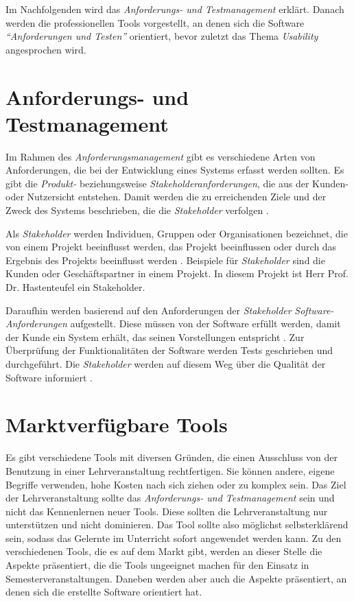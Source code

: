 \documentclass[11pt,a4paper]{report}
\begin{document}
Im Nachfolgenden wird das \textit{Anforderungs- und Testmanagement} erklärt. Danach werden die professionellen Tools vorgestellt, an denen sich die Software  \textit{"`Anforderungen und Testen"'} orientiert, bevor zuletzt das Thema \textit{Usability} angesprochen wird.

\section{Anforderungs- und Testmanagement} 
\label{s:anfundtest}

Im Rahmen des \textit{Anforderungsmanagement} gibt es verschiedene Arten von Anforderungen, die bei der Entwicklung eines Systems erfasst werden sollten. Es gibt die \textit{Produkt-} beziehungsweise \textit{Stakeholderanforderungen}, die aus der Kunden- oder Nutzersicht entstehen. Damit werden die zu erreichenden Ziele und der Zweck des Systems beschrieben, die die \textit{Stakeholder} verfolgen \cite{htm}. 

Als \textit{Stakeholder} werden Individuen, Gruppen oder Organisationen bezeichnet, die von einem Projekt beeinflusst werden, das Projekt beeinflussen oder durch das Ergebnis des Projekts beeinflusst werden \cite{pmbok}. Beispiele für \textit{Stakeholder} sind die Kunden oder Geschäftspartner in einem Projekt. In diesem Projekt ist Herr Prof. Dr. Hastenteufel ein Stakeholder.


Daraufhin werden basierend auf den Anforderungen der \textit{Stakeholder} \textit{Software-Anforderungen} aufgestellt. Diese müssen von der Software erfüllt werden, damit der Kunde ein System erhält, das seinen Vorstellungen entspricht \cite{htm}. Zur Überprüfung der Funktionalitäten der Software werden Tests geschrieben und durchgeführt. Die \textit{Stakeholder} werden auf diesem Weg über die Qualität der Software informiert \cite{powerpoint}.


\section{Marktverfügbare Tools} 
\label{chap:Tools}


Es gibt verschiedene Tools mit diversen Gründen, die einen Ausschluss von der Benutzung in einer Lehrveranstaltung rechtfertigen. Sie können andere, eigene Begriffe verwenden, hohe Kosten nach sich ziehen oder zu komplex sein. Das Ziel der Lehrveranstaltung sollte das \textit{Anforderungs- und Testmanagement} sein und nicht das Kennenlernen neuer Tools. Diese sollten die Lehrveranstaltung nur unterstützen und nicht dominieren. Das Tool sollte also möglichst selbsterklärend sein, sodass das Gelernte im Unterricht sofort angewendet werden kann. Zu den verschiedenen Tools, die es auf dem Markt gibt, werden an dieser Stelle die Aspekte präsentiert, die die Tools ungeeignet machen für den Einsatz in Semesterveranstaltungen. Daneben werden aber auch die Aspekte präsentiert, an denen sich die erstellte Software orientiert hat.
\end{document}
